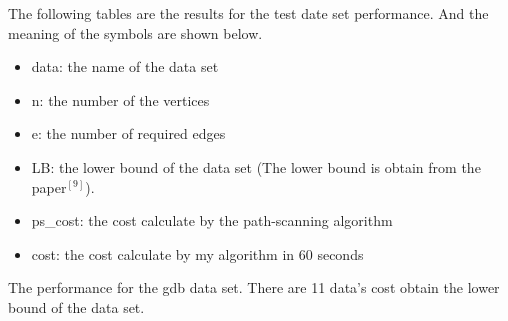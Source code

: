 \documentclass[conference,compsoc]{IEEEtran}
\begin{document}
\begin{appendix}
The following tables are the results for the test date set performance. And the meaning of the symbols are shown below.
\begin{itemize}
\item data: the name of the data set
\item n: the number of the vertices
\item e: the number of required edges
\item LB: the lower bound of the data set (The lower bound is obtain from the paper$^{[9]}$).
\item ps\_cost: the cost calculate by the path-scanning algorithm
\item cost: the cost calculate by my algorithm in 60 seconds
\end{itemize}

The performance for the gdb data set. There are 11 data's cost obtain the lower bound of the data set.


\end{appendix}
\end{document}
